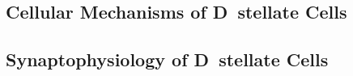 


\subsection{Cellular Mechanisms of D~stellate Cells}


\subsection{Synaptophysiology of D~stellate Cells}

\citep{FerragamoGoldingEtAl:1998a}


